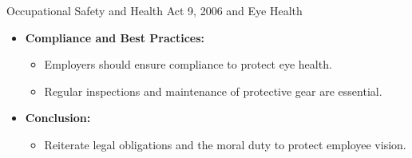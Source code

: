 \begin{frame}[plain, shrink=25]{Occupational Safety and Health Act 9, 2006 and Eye Health}
\begin{multicols}{2}
\begin{itemize}
            \item \textbf{Compliance and Best Practices:}
            \begin{itemize}
                \item Employers should ensure compliance to protect eye health.
                \item Regular inspections and maintenance of protective gear are essential.
            \end{itemize}
            
            \item \textbf{Conclusion:}
            \begin{itemize}
                \item Reiterate legal obligations and the moral duty to protect employee vision.
            \end{itemize}
        \end{itemize}

    \end{multicols}
        

\end{frame}

